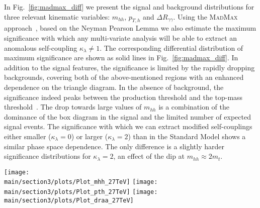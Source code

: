 In Fig.~\ref{fig:madmax_diff} we present the signal and background 
distributions for three relevant kinematic variables: $m_{hh}$, $p_{T,h}$
and $\Delta R_{\gamma\gamma}$. Using the \textsc{MadMax} 
approach~\cite{Cranmer:2006zs, Plehn:2013paa}, based on the Neyman Pearson Lemma we 
also estimate the maximum significance with which any multi-variate 
analysis will be able to extract an anomalous self-coupling 
$\kappa_\lambda \neq1$. The corresponding differential distribution of 
maximum significance are shown as solid lines in Fig.~\ref{fig:madmax_diff}. 
In addition to the signal features, the significance is limited by the rapidly dropping 
backgrounds, covering both of the above-mentioned regions with an enhanced dependence 
on the triangle diagram. In the absence of background, the significance 
indeed peaks between the production threshold and the top-mass
threshold~\cite{Kling:2016lay}.  The drop towards large values of $m_{hh}$
is a combination of the dominance of the box diagram in the signal and
the limited number of expected signal events.  The significance with
which we can extract modified self-couplings either smaller
($\kappa_\lambda = 0$) or larger ($\kappa_\lambda = 2$) than in the
Standard Model shows a similar phase space dependence. The only
difference is a slightly harder significance distributions for
$\kappa_\lambda = 2$, an effect of the dip at
$m_{hh}\approx 2m_t$.

\begin{figure*}[t]
  \texttt{[image: \\main/section3/plots/Plot\_mhh\_27TeV]}
  \texttt{[image: \\main/section3/plots/Plot\_pth\_27TeV]}
  \texttt{[image: \\main/section3/plots/Plot\_draa\_27TeV]}
  \caption{Kinematic distributions (dashed lines with left vertical
    axes) and significance distribution (solid lines with right
    vertical axes) assuming a Higgs self-coupling with
    $\kappa_\lambda=0,1,2$ for the HE-LHC. The significance describes the
    discrimination of an anomalous self-coupling $\kappa_\lambda \neq
    1$ from the SM hypothesis $\kappa_\lambda = 1$.}
\label{fig:madmax_diff}
\end{figure*}


